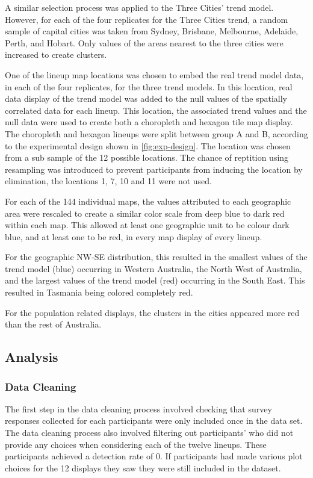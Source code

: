 \documentclass[conference,final,]{IEEEtran}
\begin{document}
A similar selection process was applied to the Three Cities' trend model. However, for each of the four replicates for the Three Cities trend, a random sample of capital cities was taken from Sydney, Brisbane, Melbourne, Adelaide, Perth, and Hobart. Only values of the areas nearest to the three cities were increased to create clusters.

One of the lineup map locations was chosen to embed the real trend model data, in each of the four replicates, for the three trend models.
In this location, real data display of the trend model was added to the null values of the spatially correlated data for each lineup. This location, the associated trend values and the null data were used to create both a choropleth and hexagon tile map display.
The choropleth and hexagon lineups were split between group A and B, according to the experimental design shown in \ref{fig:exp-design}.
The location was chosen from a sub sample of the 12 possible locations. The chance of reptition using resampling was introduced to prevent participants from inducing the location by elimination, the locations 1, 7, 10 and 11 were not used.

For each of the 144 individual maps, the values attributed to each geographic area were rescaled to create a similar color scale from deep blue to dark red within each map.
This allowed at least one geographic unit to be colour dark blue, and at least one to be red, in every map display of every lineup.

For the geographic NW-SE distribution, this resulted in the smallest values of the trend model (blue) occurring in Western Australia, the North West of Australia, and the largest values of the trend model (red) occurring in the South East. This resulted in Tasmania being colored completely red.

For the population related displays, the clusters in the cities appeared more red than the rest of Australia.

\hypertarget{analysis}{%
\subsection{Analysis}\label{analysis}}

\hypertarget{data-cleaning}{%
\subsubsection{Data Cleaning}\label{data-cleaning}}

The first step in the data cleaning process involved checking that survey responses collected for each participants were only included once in the data set.
The data cleaning process also involved filtering out participants' who did not provide any choices when considering each of the twelve lineups. These participants achieved a detection rate of 0. If participants had made various plot choices for the 12 displays they saw they were still included in the dataset.
\end{document}
